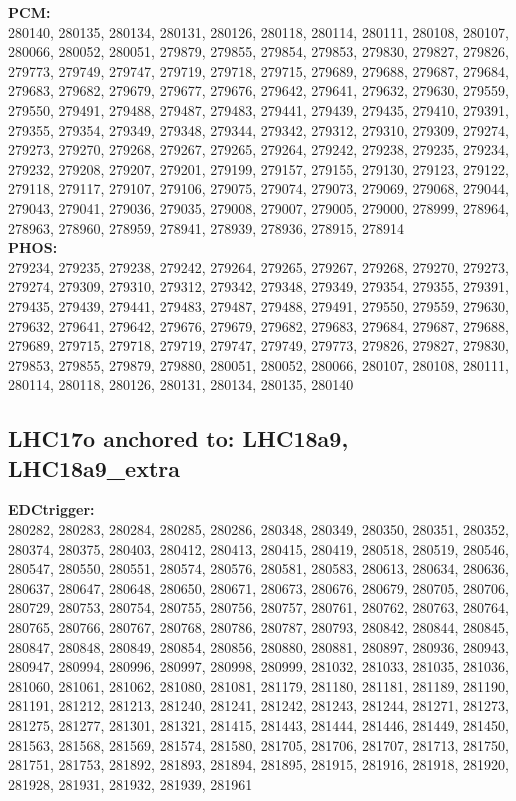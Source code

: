  \textbf{PCM:}\\
280140, 280135, 280134, 280131, 280126, 280118, 280114, 280111, 280108, 280107, 280066, 280052, 280051, 279879, 279855, 279854, 279853, 279830, 279827, 279826, 279773, 279749, 279747, 279719, 279718, 279715, 279689, 279688, 279687, 279684, 279683, 279682, 279679, 279677, 279676, 279642, 279641, 279632, 279630, 279559, 279550, 279491, 279488, 279487, 279483, 279441, 279439, 279435, 279410, 279391, 279355, 279354, 279349, 279348, 279344, 279342, 279312, 279310, 279309, 279274, 279273, 279270, 279268, 279267, 279265, 279264, 279242, 279238, 279235, 279234, 279232, 279208, 279207, 279201, 279199, 279157, 279155, 279130, 279123, 279122, 279118, 279117, 279107, 279106, 279075, 279074, 279073, 279069, 279068, 279044, 279043, 279041, 279036, 279035, 279008, 279007, 279005, 279000, 278999, 278964, 278963, 278960, 278959, 278941, 278939, 278936, 278915, 278914\\

 \textbf{PHOS:}\\
279234, 279235, 279238, 279242, 279264, 279265, 279267, 279268, 279270, 279273, 279274, 279309, 279310, 279312, 279342, 279348, 279349, 279354, 279355, 279391, 279435, 279439, 279441, 279483, 279487, 279488, 279491, 279550, 279559, 279630, 279632, 279641, 279642, 279676, 279679, 279682, 279683, 279684, 279687, 279688, 279689, 279715, 279718, 279719, 279747, 279749, 279773, 279826, 279827, 279830, 279853, 279855, 279879, 279880, 280051, 280052, 280066, 280107, 280108, 280111, 280114, 280118, 280126, 280131, 280134, 280135, 280140\\

 \subsection{LHC17o anchored to: LHC18a9, LHC18a9\_extra}

 \textbf{EDCtrigger:}\\
280282, 280283, 280284, 280285, 280286, 280348, 280349, 280350, 280351, 280352, 280374, 280375, 280403, 280412, 280413, 280415, 280419, 280518, 280519, 280546, 280547, 280550, 280551, 280574, 280576, 280581, 280583, 280613, 280634, 280636, 280637, 280647, 280648, 280650, 280671, 280673, 280676, 280679, 280705, 280706, 280729, 280753, 280754, 280755, 280756, 280757, 280761, 280762, 280763, 280764, 280765, 280766, 280767, 280768, 280786, 280787, 280793, 280842, 280844, 280845, 280847, 280848, 280849, 280854, 280856, 280880, 280881, 280897, 280936, 280943, 280947, 280994, 280996, 280997, 280998, 280999, 281032, 281033, 281035, 281036, 281060, 281061, 281062, 281080, 281081, 281179, 281180, 281181, 281189, 281190, 281191, 281212, 281213, 281240, 281241, 281242, 281243, 281244, 281271, 281273, 281275, 281277, 281301, 281321, 281415, 281443, 281444, 281446, 281449, 281450, 281563, 281568, 281569, 281574, 281580, 281705, 281706, 281707, 281713, 281750, 281751, 281753, 281892, 281893, 281894, 281895, 281915, 281916, 281918, 281920, 281928, 281931, 281932, 281939, 281961\\

